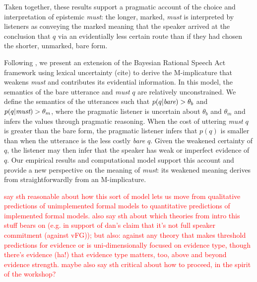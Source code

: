 \documentclass[11pt]{article}
\newcommand{\red}[1]{\textcolor{Red}{#1}}
\begin{document}
Taken together, these results support a pragmatic account of the choice and interpretation of epistemic \emph{must}: the longer, marked, \emph{must} is interpreted by listeners as conveying the marked meaning that the speaker arrived at the conclusion that $q$ via an evidentially less certain route than if they had chosen the shorter, unmarked, bare form. %

Following , we present an extension of the Bayesian Rational Speech Act framework  using lexical uncertainty (cite) to derive the M-implicature that weakens \emph{must} and contributes its evidential information. In this model,  the semantics of the bare utterance and \emph{must} $q$ are relatively unconstrained. We define the semantics of the utterances such that $p(q | \emph{bare} ) > \theta_b$ and $p(q | \emph{must} ) > \theta_m$, where the pragmatic listener is uncertain about $\theta_b$ and $\theta_m$ and infers the values through pragmatic reasoning. When the cost of uttering \emph{must} $q$ is greater than the bare form, the pragmatic listener infers that $p(q)$ is smaller than when the utterance is the less costly \emph{bare} $q$. 
Given the weakened certainty of $q$, the listener may then infer that the speaker has weak or imperfect evidence of $q$. Our empirical results and computational model  support this account and provide a new perspective on the meaning of \emph{must}: its weakened meaning derives from straightforwardly from an M-implicature.

\red{say sth reasonable about how this sort of model lets us move from qualitative predictions of unimplemented formal models to quantitative predictions of implemented formal models. also say sth about which theories from intro this stuff bears on (e.g. in support of dan's claim that it's not full speaker commitment (against vFG)); but also: against any theory that makes threshold predictions for evidence or is uni-dimensionally focused on evidence type, though there's evidence (ha!) that evidence type matters, too, above and beyond evidence strength. maybe also say sth critical about how to proceed, in the spirit of the workshop?}



\end{document}
